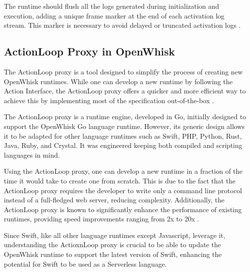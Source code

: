The runtime should flush all the logs generated during initialization and execution, adding a unique frame marker at the end of each activation log stream. This marker is necessary to avoid delayed or truncated activation logs \cite{openwhisk2023}.

\subsection{ActionLoop Proxy in OpenWhisk}

The ActionLoop proxy is a tool designed to simplify the process of creating new OpenWhisk runtimes. While one can develop a new runtime by following the Action Interface, the ActionLoop proxy offers a quicker and more efficient way to achieve this by implementing most of the specification out-of-the-box \cite{action-proxy}.

The ActionLoop proxy is a runtime engine, developed in Go, initially designed to support the OpenWhisk Go language runtime. However, its generic design allows it to be adapted for other language runtimes such as Swift, PHP, Python, Rust, Java, Ruby, and Crystal. It was engineered keeping both compiled and scripting languages in mind.

Using the ActionLoop proxy, one can develop a new runtime in a fraction of the time it would take to create one from scratch. This is due to the fact that the ActionLoop proxy requires the developer to write only a command line protocol instead of a full-fledged web server, reducing complexity. Additionally, the ActionLoop proxy is known to significantly enhance the performance of existing runtimes, providing speed improvements ranging from 2x to 20x \cite{action-proxy}.

Since Swift, like all other language runtimes except Javascript, leverage it, understanding the ActioxnLoop proxy is crucial to be able to update the OpenWhisk runtime to support the latest version of Swift, enhancing the potential for Swift to be used as a Serverless language.


